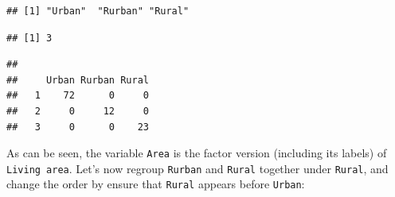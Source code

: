 \documentclass[
]{krantz}
\makeatletter
\newenvironment{Shaded}{\begin{snugshade}}{\end{snugshade}}
\newcommand{\AttributeTok}[1]{\textcolor[rgb]{0.61,0.61,0.61}{#1}}
\newcommand{\DecValTok}[1]{\textcolor[rgb]{0.06,0.06,0.06}{#1}}
\newcommand{\FunctionTok}[1]{\textcolor[rgb]{0,0,0}{#1}}
\newcommand{\NormalTok}[1]{#1}
\newcommand{\OtherTok}[1]{\textcolor[rgb]{0.37,0.37,0.37}{#1}}
\newcommand{\SpecialCharTok}[1]{\textcolor[rgb]{0,0,0}{#1}}
\newcommand{\StringTok}[1]{\textcolor[rgb]{0.5,0.5,0.5}{#1}}
\newenvironment{kframe}{%
\medskip{}
\setlength{\fboxsep}{.8em}
 \def\at@end@of@kframe{}%
 \ifinner\ifhmode%
  \def\at@end@of@kframe{\end{minipage}}%
  \begin{minipage}{\columnwidth}%
 \fi\fi%
 \def\FrameCommand##1{\hskip\@totalleftmargin \hskip-\fboxsep
 \colorbox{shadecolor}{##1}\hskip-\fboxsep
     \hskip-\linewidth \hskip-\@totalleftmargin \hskip\columnwidth}%
 \MakeFramed {\advance\hsize-\width
   \@totalleftmargin\z@ \linewidth\hsize
   \@setminipage}}%
 {\par\unskip\endMakeFramed%
 \at@end@of@kframe}
\renewenvironment{Shaded}{\begin{kframe}}{\end{kframe}}
\makeatother
\begin{document}
\begin{Shaded}
\end{Shaded}

\begin{verbatim}
## [1] "Urban"  "Rurban" "Rural"
\end{verbatim}

\begin{Shaded}
\end{Shaded}

\begin{verbatim}
## [1] 3
\end{verbatim}

\begin{Shaded}
\end{Shaded}

\begin{verbatim}
##    
##     Urban Rurban Rural
##   1    72      0     0
##   2     0     12     0
##   3     0      0    23
\end{verbatim}

As can be seen, the variable \texttt{Area} is the factor version (including its labels) of \texttt{Living\ area}.
Let's now regroup \texttt{Rurban} and \texttt{Rural} together under \texttt{Rural}, and change the order by ensure that \texttt{Rural} appears before \texttt{Urban}:
\end{document}
